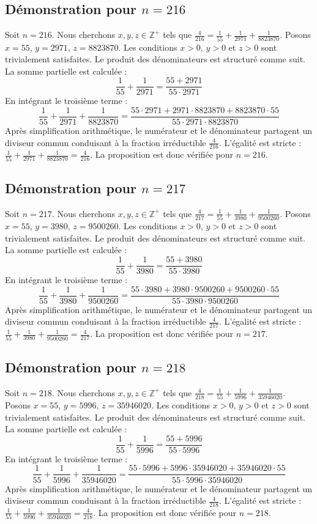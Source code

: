 \documentclass[11pt,a4paper]{article}
\begin{document}
\subsection{Démonstration pour $n = 216$}
Soit $n = 216$. Nous cherchons $x, y, z \in \mathbb{Z}^{+}$ tels que $\frac{4}{216} = \frac{1}{55} + \frac{1}{2971} + \frac{1}{8823870}$.
Posons $x = 55$, $y = 2971$, $z = 8823870$.
Les conditions $x > 0$, $y > 0$ et $z > 0$ sont trivialement satisfaites.
Le produit des dénominateurs est structuré comme suit. La somme partielle est calculée :
$$ \frac{1}{55} + \frac{1}{2971} = \frac{55+2971}{55 \cdot 2971} $$
En intégrant le troisième terme :
$$ \frac{1}{55} + \frac{1}{2971} + \frac{1}{8823870} = \frac{55 \cdot 2971 + 2971 \cdot 8823870 + 8823870 \cdot 55}{55 \cdot 2971 \cdot 8823870} $$
Après simplification arithmétique, le numérateur et le dénominateur partagent un diviseur commun conduisant à la fraction irréductible $\frac{4}{216}$.
L'égalité est stricte : $\frac{1}{55} + \frac{1}{2971} + \frac{1}{8823870} = \frac{4}{216}$.
La proposition est donc vérifiée pour $n = 216$.
\subsection{Démonstration pour $n = 217$}
Soit $n = 217$. Nous cherchons $x, y, z \in \mathbb{Z}^{+}$ tels que $\frac{4}{217} = \frac{1}{55} + \frac{1}{3980} + \frac{1}{9500260}$.
Posons $x = 55$, $y = 3980$, $z = 9500260$.
Les conditions $x > 0$, $y > 0$ et $z > 0$ sont trivialement satisfaites.
Le produit des dénominateurs est structuré comme suit. La somme partielle est calculée :
$$ \frac{1}{55} + \frac{1}{3980} = \frac{55+3980}{55 \cdot 3980} $$
En intégrant le troisième terme :
$$ \frac{1}{55} + \frac{1}{3980} + \frac{1}{9500260} = \frac{55 \cdot 3980 + 3980 \cdot 9500260 + 9500260 \cdot 55}{55 \cdot 3980 \cdot 9500260} $$
Après simplification arithmétique, le numérateur et le dénominateur partagent un diviseur commun conduisant à la fraction irréductible $\frac{4}{217}$.
L'égalité est stricte : $\frac{1}{55} + \frac{1}{3980} + \frac{1}{9500260} = \frac{4}{217}$.
La proposition est donc vérifiée pour $n = 217$.
\subsection{Démonstration pour $n = 218$}
Soit $n = 218$. Nous cherchons $x, y, z \in \mathbb{Z}^{+}$ tels que $\frac{4}{218} = \frac{1}{55} + \frac{1}{5996} + \frac{1}{35946020}$.
Posons $x = 55$, $y = 5996$, $z = 35946020$.
Les conditions $x > 0$, $y > 0$ et $z > 0$ sont trivialement satisfaites.
Le produit des dénominateurs est structuré comme suit. La somme partielle est calculée :
$$ \frac{1}{55} + \frac{1}{5996} = \frac{55+5996}{55 \cdot 5996} $$
En intégrant le troisième terme :
$$ \frac{1}{55} + \frac{1}{5996} + \frac{1}{35946020} = \frac{55 \cdot 5996 + 5996 \cdot 35946020 + 35946020 \cdot 55}{55 \cdot 5996 \cdot 35946020} $$
Après simplification arithmétique, le numérateur et le dénominateur partagent un diviseur commun conduisant à la fraction irréductible $\frac{4}{218}$.
L'égalité est stricte : $\frac{1}{55} + \frac{1}{5996} + \frac{1}{35946020} = \frac{4}{218}$.
La proposition est donc vérifiée pour $n = 218$.
\end{document}
